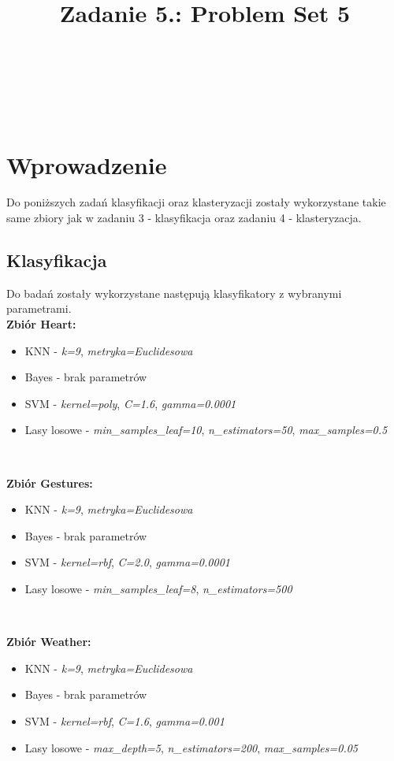 \documentclass{classrep}
\author{%
    \studentinfo[239661@edu.p.lodz.pl]{Szymon Gruda}{239661}\\
    \studentinfo[239671@edu.p.lodz.pl]{Jan Karwowski}{239671}\\
    \studentinfo[239673@edu.p.lodz.pl]{Michał Kidawa}{239673}\\
    \studentinfo[239676@edu.p.lodz.pl]{Kamil Kowalewski}{239676}\\
}
\title{Zadanie 5.: Problem Set 5}
\begin{document}
    \maketitle
    \thispagestyle{fancyplain}

    \newpage
    \tableofcontents
    \newpage

    \section{Wprowadzenie}
    \label{intro} {
        Do poniższych zadań klasyfikacji oraz klasteryzacji zostały wykorzystane takie
        same zbiory jak w zadaniu 3 - klasyfikacja oraz zadaniu 4 - klasteryzacja.

        \subsection{Klasyfikacja}
        \label{intro:classification} {
            Do badań zostały wykorzystane następują klasyfikatory z wybranymi
            parametrami.\\
            \textbf{Zbiór Heart:}
            \begin{itemize}
                \item KNN - \textit{k=9}, \textit{metryka=Euclidesowa}
                \item Bayes - brak parametrów
                \item SVM - \textit{kernel=poly}, \textit{C=1.6}, \textit{gamma=0.0001}
                \item Lasy losowe - \textit{min\_samples\_leaf=10}, \textit{n\_estimators=50}, \textit{max\_samples=0.5}
            \end{itemize}
            \

            \textbf{Zbiór Gestures:}
            \begin{itemize}
                \item KNN - \textit{k=9}, \textit{metryka=Euclidesowa}
                \item Bayes - brak parametrów
                \item SVM - \textit{kernel=rbf}, \textit{C=2.0}, \textit{gamma=0.0001}
                \item Lasy losowe - \textit{min\_samples\_leaf=8}, \textit{n\_estimators=500}
            \end{itemize}
            \

            \textbf{Zbiór Weather:}
            \begin{itemize}
                \item KNN - \textit{k=9}, \textit{metryka=Euclidesowa}
                \item Bayes - brak parametrów
                \item SVM - \textit{kernel=rbf}, \textit{C=1.6}, \textit{gamma=0.001}
                \item Lasy losowe - \textit{max\_depth=5}, \textit{n\_estimators=200}, \textit{max\_samples=0.05}
            \end{itemize}
        }

}
\end{document}
